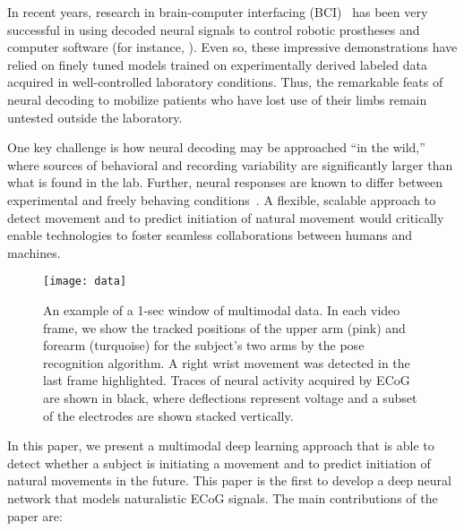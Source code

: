 \documentclass[letterpaper]{article} %
\begin{document}
In recent years, research in brain-computer interfacing (BCI)~\cite{Wolpaw2012,rao2013} has been very successful in using decoded neural signals to control robotic prostheses and computer software (for instance, \cite{hochberg2012,McMullen2014,Yanagisawa2011}).
Even so, these impressive demonstrations have relied on finely tuned models trained on experimentally derived labeled data acquired in well-controlled laboratory conditions.
Thus, the remarkable feats of neural decoding to mobilize patients who have lost use of their limbs remain untested outside the laboratory. %

One key challenge is how neural decoding may be approached ``in the wild,'' where sources of behavioral and recording variability are significantly larger than what is found in the lab.
Further, neural responses are known to differ between experimental and freely behaving conditions~\cite{Jackson2007}.
A flexible, scalable approach to detect movement and to predict initiation of natural movement would critically enable technologies to foster seamless collaborations between humans and machines.

\begin{figure*}[t]
\texttt{[image: data]} %
\caption{An example of a 1-sec window of multimodal data. 
In each video frame, we show the tracked positions of the upper arm (pink) and forearm (turquoise) for the subject's two arms by the pose recognition algorithm. A right wrist movement was detected in the last frame highlighted. Traces of neural activity acquired by ECoG are shown in black, where deflections represent voltage and a subset of the electrodes are shown stacked vertically.}
\label{fig:samples}
\end{figure*}


In this paper, we present a multimodal deep learning approach that is able to detect whether a subject is initiating a movement and to predict initiation of natural movements in the future.
This paper is the first to develop a deep neural network that models naturalistic ECoG signals. 
The main contributions of the paper are:
\end{document}
